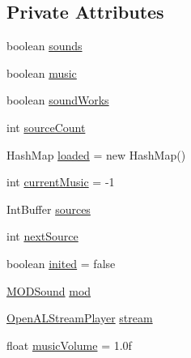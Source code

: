 \subsection*{Private Attributes}
\begin{DoxyCompactItemize}
\item 
boolean \mbox{\hyperlink{classorg_1_1newdawn_1_1slick_1_1openal_1_1_sound_store_a64f1d8fb16c0b816d20abf0e695a85ec}{sounds}}
\item 
boolean \mbox{\hyperlink{classorg_1_1newdawn_1_1slick_1_1openal_1_1_sound_store_a7e15ee371935f6d530e4481ac9e2bd7e}{music}}
\item 
boolean \mbox{\hyperlink{classorg_1_1newdawn_1_1slick_1_1openal_1_1_sound_store_a59336c6a0a15fe41ae84b942d519a3df}{sound\+Works}}
\item 
int \mbox{\hyperlink{classorg_1_1newdawn_1_1slick_1_1openal_1_1_sound_store_ad1c2294ac984e23e608068a85aba4b69}{source\+Count}}
\item 
Hash\+Map \mbox{\hyperlink{classorg_1_1newdawn_1_1slick_1_1openal_1_1_sound_store_a886b8963df160c2a880f5a33e37397fc}{loaded}} = new Hash\+Map()
\item 
int \mbox{\hyperlink{classorg_1_1newdawn_1_1slick_1_1openal_1_1_sound_store_a533d86a926110a3d75449fa186015f07}{current\+Music}} = -\/1
\item 
Int\+Buffer \mbox{\hyperlink{classorg_1_1newdawn_1_1slick_1_1openal_1_1_sound_store_a3a2ffa73acd847102bb30140129c440b}{sources}}
\item 
int \mbox{\hyperlink{classorg_1_1newdawn_1_1slick_1_1openal_1_1_sound_store_a71a886c69ea2caf43663bec4d121370f}{next\+Source}}
\item 
boolean \mbox{\hyperlink{classorg_1_1newdawn_1_1slick_1_1openal_1_1_sound_store_ad607db06655c505a0d3aa73eb16a06e1}{inited}} = false
\item 
\mbox{\hyperlink{classorg_1_1newdawn_1_1slick_1_1openal_1_1_m_o_d_sound}{M\+O\+D\+Sound}} \mbox{\hyperlink{classorg_1_1newdawn_1_1slick_1_1openal_1_1_sound_store_acfae79fd86ae031150acd19e30894aaa}{mod}}
\item 
\mbox{\hyperlink{classorg_1_1newdawn_1_1slick_1_1openal_1_1_open_a_l_stream_player}{Open\+A\+L\+Stream\+Player}} \mbox{\hyperlink{classorg_1_1newdawn_1_1slick_1_1openal_1_1_sound_store_a3529a80a2ca84a63d3bdc55194f52ac7}{stream}}
\item 
float \mbox{\hyperlink{classorg_1_1newdawn_1_1slick_1_1openal_1_1_sound_store_a1394ddfb866b8bc402414b8f861227c0}{music\+Volume}} = 1.\+0f
\item 

\end{DoxyCompactItemize}
